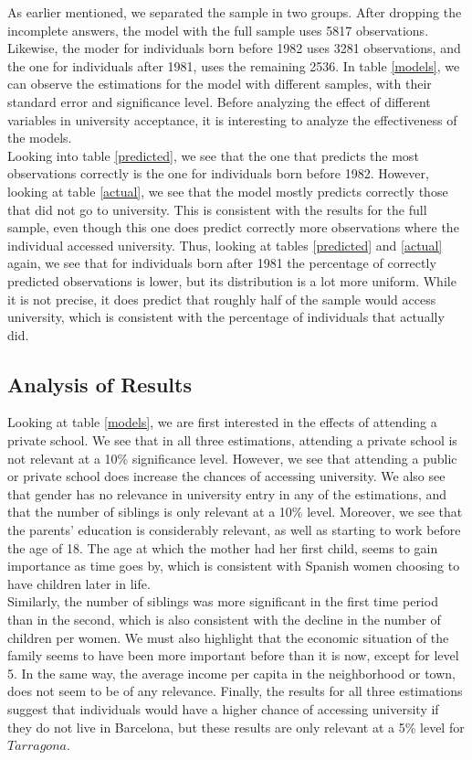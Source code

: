 \documentclass[12pt]{article}
\begin{document}
As earlier mentioned, we separated the sample in two groups. After dropping the incomplete answers, the model with the full sample uses 5817 observations. Likewise, the moder for individuals born before 1982 uses 3281 observations, and the one for individuals after 1981, uses the remaining 2536. In table \ref{models}, we can observe the estimations for the model with different samples, with their standard error and significance level. Before analyzing the effect of different variables in university acceptance, it is interesting to analyze the effectiveness of the models. \\
Looking into table \ref{predicted}, we see that the one that predicts the most observations correctly is the one for individuals born before 1982. However, looking at table \ref{actual}, we see that the model mostly predicts correctly those that did not go to university. This is consistent with the results for the full sample, even though this one does predict correctly more observations where the individual accessed university. Thus, looking at tables \ref{predicted} and \ref{actual} again, we see that for individuals born after 1981 the percentage of correctly predicted observations is lower, but its distribution is a lot more uniform. While it is not precise, it does predict that roughly half of the sample would access university, which is consistent with the percentage of individuals that actually did.
\subsection{Analysis of Results}
Looking at table \ref{models}, we are first interested in the effects of attending a private school. We see that in all three estimations, attending a private school is not relevant at a 10\% significance level. However, we see that attending a public or private school does increase the chances of accessing university. We also see that gender has no relevance in university entry in any of the estimations, and that the number of siblings is only relevant at a 10\% level. Moreover, we see that the parents' education is considerably relevant, as well as starting to work before the age of 18. The age at which the mother had her first child, seems to gain importance as time goes by, which is consistent with Spanish women choosing to have children later in life.\\ 
Similarly, the number of siblings was more significant in the first time period than in the second, which is also consistent with the decline in the number of children per women. We must also highlight that the economic situation of the family seems to have been more important before than it is now, except for level 5. In the same way, the average income per capita in the neighborhood or town, does not seem to be of any relevance. Finally, the results for all three estimations suggest that individuals would have a higher chance of accessing university if they do not live in Barcelona, but these results are only relevant at a 5\% level for $Tarragona$.
\end{document}
